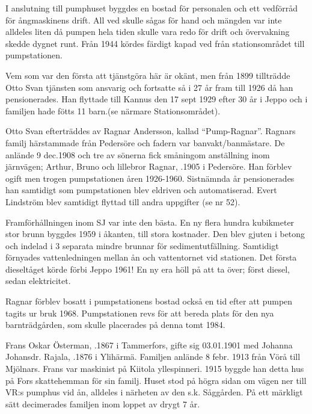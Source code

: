 
I anslutning till pumphuset byggdes en bostad för personalen och ett vedförråd för ångmaskinens drift. All ved skulle sågas för hand och mängden var inte alldeles liten då pumpen hela tiden skulle vara redo för drift och övervakning skedde dygnet runt. Från 1944 kördes färdigt kapad ved från stationsområdet till pumpstationen.

Vem som var den första att tjänstgöra här är okänt, men från 1899 tillträdde Otto Svan tjänsten som ansvarig och fortsatte så i 27 år fram till 1926 då han pensionerades. Han flyttade till Kannus den 17 sept 1929 efter 30 år i Jeppo och i familjen hade fötts 11 barn.(se närmare Stationsområdet).

Otto Svan efterträddes av Ragnar Andersson, kallad ``Pump-Ragnar''. Ragnars familj härstammade från Pedersöre och fadern var banvakt/banmästare. De anlände 9 dec.1908 och tre av sönerna fick småningom anställning inom järnvägen; Arthur, Bruno och lillebror Ragnar, .1905 i Pedersöre. Han förblev ogift men trogen pumpstationen åren 1926-1960. Sistnämnda år pensionerades han samtidigt som pumpstationen blev eldriven och automatiserad. Evert Lindström blev samtidigt flyttad till andra uppgifter (se nr 52).

Framförhållningen inom SJ var inte den bästa. En ny flera hundra kubikmeter stor brunn byggdes 1959 i åkanten, till stora kostnader. Den blev gjuten i betong och indelad i 3 separata mindre brunnar för sedimentutfällning. Samtidigt förnyades vattenledningen mellan ån och vattentornet vid stationen. Det första dieseltåget körde förbi Jeppo 1961! En ny era höll på att ta över; först diesel, sedan elektricitet.



Ragnar förblev bosatt i  pumpstationens bostad också en tid efter att pumpen tagits ur bruk 1968. Pumpstationen revs för att bereda plats för den nya barnträdgården, som skulle placerades på denna tomt 1984.




Frans Oskar Österman, .1867 i Tammerfors, gifte sig 03.01.1901 med Johanna Johansdr. Rajala, .1876 i Ylihärmä.
Familjen anlände 8 febr. 1913 från Vörå till Mjölnars. Frans var maskinist på Kiitola yllespinneri. 1915 byggde han detta hus på Fors skattehemman för sin familj. Huset stod på högra sidan om vägen ner till VR:s pumphus vid ån, alldeles i närheten av den s.k. Såggården. På ett märkligt sätt decimerades familjen inom loppet av drygt 7 år.

